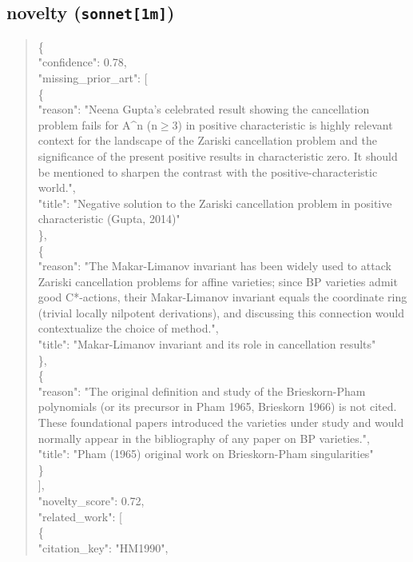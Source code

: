 \documentclass[11pt]{article}
\begin{document}
\subsection*{novelty (\texttt{sonnet[1m]})}
\begin{quote}\small\ttfamily\raggedright
\{\\
  "confidence": 0.78,\\
  "missing\_prior\_art": [\\
    \{\\
      "reason": "Neena Gupta's celebrated result showing the cancellation problem fails for A\^{}n (n\ensuremath{\ge}3) in positive characteristic is highly relevant context for the landscape of the Zariski cancellation problem and the significance of the present positive results in characteristic zero. It should be mentioned to sharpen the contrast with the positive-characteristic world.",\\
      "title": "Negative solution to the Zariski cancellation problem in positive characteristic (Gupta, 2014)"\\
    \},\\
    \{\\
      "reason": "The Makar-Limanov invariant has been widely used to attack Zariski cancellation problems for affine varieties; since BP varieties admit good C*-actions, their Makar-Limanov invariant equals the coordinate ring (trivial locally nilpotent derivations), and discussing this connection would contextualize the choice of method.",\\
      "title": "Makar-Limanov invariant and its role in cancellation results"\\
    \},\\
    \{\\
      "reason": "The original definition and study of the Brieskorn-Pham polynomials (or its precursor in Pham 1965, Brieskorn 1966) is not cited. These foundational papers introduced the varieties under study and would normally appear in the bibliography of any paper on BP varieties.",\\
      "title": "Pham (1965) original work on Brieskorn-Pham singularities"\\
    \}\\
  ],\\
  "novelty\_score": 0.72,\\
  "related\_work": [\\
    \{\\
      "citation\_key": "HM1990",\\

\end{quote}
\end{document}
